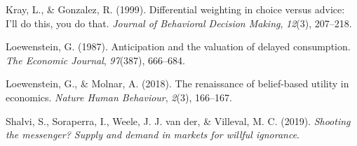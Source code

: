 \documentclass[
  man,floatsintext]{apa6}
\newlength{\cslhangindent}
\newlength{\cslentryspacingunit} %
\newenvironment{CSLReferences}[2] %
 {%
  \setlength{\parindent}{0pt}
  \ifodd #1
  \let\oldpar\par
  \def\par{\hangindent=\cslhangindent\oldpar}
  \fi
  \setlength{\parskip}{#2\cslentryspacingunit}
 }%
 {}
\begin{document}
\begin{CSLReferences}{1}{0}
\leavevmode{}%
Kray, L., \& Gonzalez, R. (1999). Differential weighting in choice versus advice: {I}'ll do this, you do that. \emph{Journal of Behavioral Decision Making}, \emph{12}(3), 207--218.

\leavevmode{}%
Loewenstein, G. (1987). Anticipation and the valuation of delayed consumption. \emph{The Economic Journal}, \emph{97}(387), 666--684.

\leavevmode{}%
Loewenstein, G., \& Molnar, A. (2018). The renaissance of belief-based utility in economics. \emph{Nature Human Behaviour}, \emph{2}(3), 166--167.

\leavevmode{}%
Shalvi, S., Soraperra, I., Weele, J. J. van der, \& Villeval, M. C. (2019). \emph{Shooting the messenger? Supply and demand in markets for willful ignorance}.

\end{CSLReferences}

\endgroup
\end{document}
